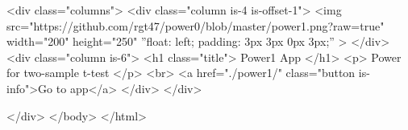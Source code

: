 \documentclass[
  letterpaper,
  DIV=11,
  numbers=noendperiod,
  oneside]{scrartcl}
\newenvironment{Shaded}{\begin{snugshade}}{\end{snugshade}}
\newcommand{\ControlFlowTok}[1]{\textcolor[rgb]{0.00,0.23,0.31}{#1}}
\newcommand{\ExtensionTok}[1]{\textcolor[rgb]{0.00,0.23,0.31}{#1}}
\newcommand{\KeywordTok}[1]{\textcolor[rgb]{0.00,0.23,0.31}{#1}}
\newcommand{\NormalTok}[1]{\textcolor[rgb]{0.00,0.23,0.31}{#1}}
\newcommand{\OperatorTok}[1]{\textcolor[rgb]{0.37,0.37,0.37}{#1}}
\newcommand{\StringTok}[1]{\textcolor[rgb]{0.13,0.47,0.30}{#1}}
\newcommand{\VariableTok}[1]{\textcolor[rgb]{0.07,0.07,0.07}{#1}}
\begin{document}
\begin{Shaded}
\begin{Highlighting}[]
            \OperatorTok{\textless{}}\NormalTok{div }\VariableTok{class}\OperatorTok{=}\StringTok{"columns"}\OperatorTok{\textgreater{}}
              \OperatorTok{\textless{}}\NormalTok{div }\VariableTok{class}\OperatorTok{=}\StringTok{"column is{-}4 is{-}offset{-}1"}\OperatorTok{\textgreater{}}
      \OperatorTok{\textless{}}\NormalTok{img }\VariableTok{src}\OperatorTok{=}\StringTok{"https://github.com/rgt47/power0/blob/master/power1.png?raw=true"}
        \VariableTok{width}\OperatorTok{=}\StringTok{"200"} \VariableTok{height}\OperatorTok{=}\StringTok{"250"}  \ExtensionTok{”float:}\NormalTok{ left}\KeywordTok{;} \ExtensionTok{padding:}\NormalTok{ 3px 3px 0px 3px}\KeywordTok{;}\ExtensionTok{”} \OperatorTok{\textgreater{}}
              \OperatorTok{\textless{}}\NormalTok{/div}\OperatorTok{\textgreater{}}
              \OperatorTok{\textless{}}\NormalTok{div }\VariableTok{class}\OperatorTok{=}\StringTok{"column is{-}6"}\OperatorTok{\textgreater{}}
                \OperatorTok{\textless{}}\NormalTok{h1 }\VariableTok{class}\OperatorTok{=}\StringTok{"title"}\OperatorTok{\textgreater{}}\NormalTok{ Power1 }\ExtensionTok{App} \OperatorTok{\textless{}}\NormalTok{/h1}\OperatorTok{\textgreater{}}
                \OperatorTok{\textless{}}\NormalTok{p}\OperatorTok{\textgreater{}}\NormalTok{ Power }\ControlFlowTok{for}\NormalTok{ two}\ExtensionTok{{-}sample}\NormalTok{ t{-}test }\OperatorTok{\textless{}}\NormalTok{/p}\OperatorTok{\textgreater{}}
                \OperatorTok{\textless{}}\NormalTok{br}\OperatorTok{\textgreater{}}
                \OperatorTok{\textless{}}\NormalTok{a }\VariableTok{href}\OperatorTok{=}\StringTok{"./power1/"} \VariableTok{class}\OperatorTok{=}\StringTok{"button is{-}info"}\OperatorTok{\textgreater{}}\NormalTok{Go }\ExtensionTok{to}\NormalTok{ app}\OperatorTok{\textless{}}\NormalTok{/a}\OperatorTok{\textgreater{}}
              \OperatorTok{\textless{}}\NormalTok{/div}\OperatorTok{\textgreater{}}
            \OperatorTok{\textless{}}\NormalTok{/div}\OperatorTok{\textgreater{}}


    \OperatorTok{\textless{}}\NormalTok{/div}\OperatorTok{\textgreater{}}
  \OperatorTok{\textless{}}\NormalTok{/body}\OperatorTok{\textgreater{}}
\OperatorTok{\textless{}}\NormalTok{/html}\OperatorTok{\textgreater{}}


\end{Highlighting}
\end{Shaded}
\end{document}
